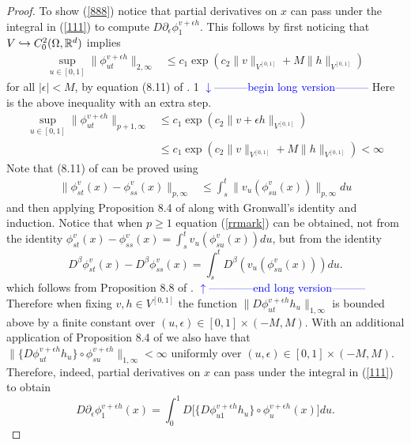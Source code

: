 \documentclass[noinfoline]{imsart}
\def\Ver{1}
\def\LongVer{1}
\begin{document}
\begin{proof}
 
 To show (\ref{888}) notice  that partial derivatives on $x$ can pass under the integral in (\ref{111})  to compute $D {\partial_\epsilon}  \phi^{ v+\epsilon h}_{1}$. This follows by first noticing that  $V\hookrightarrow C_0^{2}(\Omega, \Bbb R^d)$ implies
  \begin{align}
  \sup_{u\in[0,1]} \bigl\| \phi_{ut}^{v+\epsilon h} \bigr\|_{2,\infty}&\leq c_1 \exp\left({c_2 \|  {v\|_{V^{[0,1]}}+M\| h} \|_{V^{[0,1]}}}\right) \label{811}
  \end{align}
  for all $|\epsilon|< M$, by equation (8.11) of \cite{you:10}.
\if\Ver\LongVer{ 
{\flushleft\textcolor{blue}{$\downarrow$---------begin long version---------}}\newline
Here is the above inequality with an extra step.
 \begin{align}
  \sup_{u\in[0,1]} \| \phi_{ut}^{v+\epsilon h} \|_{p+1,\infty}&\leq c_1 \exp\left({c_2 \|  {v+\epsilon h} \|_{V^{[0,1]}}}\right)\\
  &\leq c_1 \exp\left({c_2 \|  {v\|_{V^{[0,1]}}+M\| h} \|_{V^{[0,1]}}}\right) <\infty \label{811}
  \end{align}
 Note that   (8.11) of  \cite{you:10} can be proved using
 \begin{align}
 \label{rrmark}
  \| \phi_{st}^v(x) - \phi_{ss}^v(x) \|_{p,\infty}
  &\leq\int_s^t \|  v_u(\phi_{su}^v(x))   \|_{p,\infty} du
 \end{align}
 and then applying Proposition 8.4 of \cite{you:10} along with Gronwall's identity and induction. Notice that when $p\geq 1$ equation (\ref{rrmark}) can be obtained, not from the identity $\phi_{st}^v(x) - \phi_{ss}^v(x)= \int_s^t  v_u(\phi_{su}^v(x))    du$, but from the identity
 \[ D^\beta\phi_{st}^v(x) - D^\beta\phi_{ss}^v(x)= \int_s^t    D^\beta(v_u(\phi_{su}^v(x)))   du.\]
 which follows from Proposition 8.8 of  \cite{you:10}.
   {\flushleft\textcolor{blue}{$\uparrow$------------end long version---------}}\newline
} \fi
Therefore when fixing $v, h\in V^{[0,1]}$ the function $ \| D\phi^{v+\epsilon h}_{ut} h_u \|_{1,\infty}$ is bounded above by a finite constant over $(u,\epsilon)\in[0,1]\times (-M,M)$. With an additional application of Proposition 8.4 of \cite{you:10} we also have that
  $ \bigl\| \{D\phi^{v+\epsilon h}_{ut} h_u\}\circ \phi_{su}^{v+\epsilon h} \bigr\|_{1,\infty}<\infty$ uniformly over $(u,\epsilon)\in[0,1]\times (-M,M)$.
Therefore, indeed, partial derivatives on $x$ can pass under the integral in (\ref{111})  to obtain
\begin{equation}
\label{pass}
D {\partial_\epsilon}  \phi^{ v+\epsilon h}_{1}(x) = \int_0^1 D\bigl[ \{D\phi_{u1}^{v+\epsilon h} h_u  \}\circ \phi_u^{v+\epsilon h} (x)\bigr]  du. 
\end{equation}


\end{proof}
\end{document}
